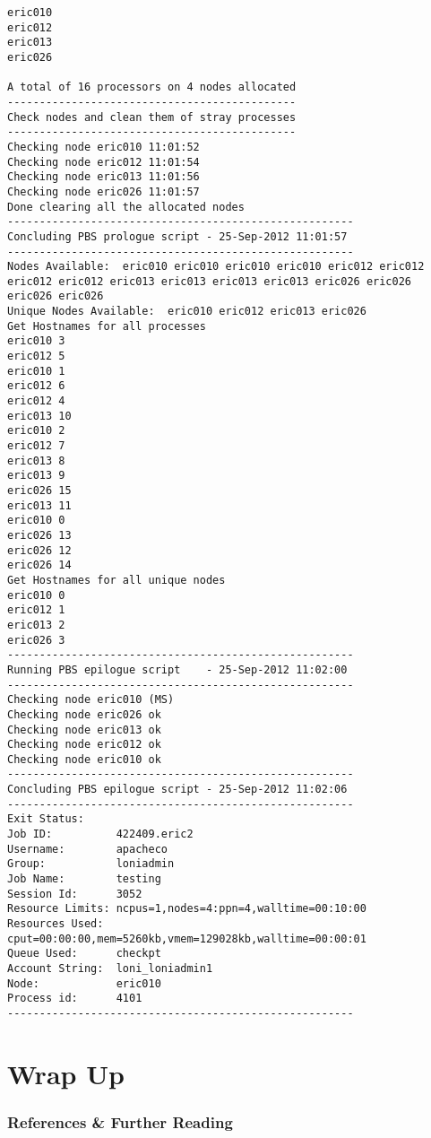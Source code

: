\documentclass[slidestop,mathserif,compress,xcolor=svgnames]{beamer}
\begin{document}
\begin{frame}
\begin{lstlisting}
eric010
eric012
eric013
eric026

A total of 16 processors on 4 nodes allocated
---------------------------------------------
Check nodes and clean them of stray processes
---------------------------------------------
Checking node eric010 11:01:52 
Checking node eric012 11:01:54 
Checking node eric013 11:01:56 
Checking node eric026 11:01:57 
Done clearing all the allocated nodes
------------------------------------------------------
Concluding PBS prologue script - 25-Sep-2012 11:01:57
------------------------------------------------------
Nodes Available:  eric010 eric010 eric010 eric010 eric012 eric012 eric012 eric012 eric013 eric013 eric013 eric013 eric026 eric026 
eric026 eric026
Unique Nodes Available:  eric010 eric012 eric013 eric026
Get Hostnames for all processes
eric010 3
eric012 5
eric010 1
eric012 6
eric012 4
eric013 10
eric010 2
eric012 7
eric013 8
eric013 9
eric026 15
eric013 11
eric010 0
eric026 13
eric026 12
eric026 14
Get Hostnames for all unique nodes
eric010 0
eric012 1
eric013 2
eric026 3
------------------------------------------------------
Running PBS epilogue script    - 25-Sep-2012 11:02:00
------------------------------------------------------
Checking node eric010 (MS)
Checking node eric026 ok
Checking node eric013 ok
Checking node eric012 ok
Checking node eric010 ok
------------------------------------------------------
Concluding PBS epilogue script - 25-Sep-2012 11:02:06
------------------------------------------------------
Exit Status:    
Job ID:          422409.eric2
Username:        apacheco
Group:           loniadmin
Job Name:        testing
Session Id:      3052
Resource Limits: ncpus=1,nodes=4:ppn=4,walltime=00:10:00
Resources Used:  cput=00:00:00,mem=5260kb,vmem=129028kb,walltime=00:00:01
Queue Used:      checkpt
Account String:  loni_loniadmin1
Node:            eric010
Process id:      4101
------------------------------------------------------
  \end{lstlisting}
\end{frame}

\section{Wrap Up}
\begin{frame}
  \frametitle{\small References \& Further Reading}
  \begin{itemize}
    \fontsize{7}{9}
  \end{itemize}
\end{frame}
\end{document}
